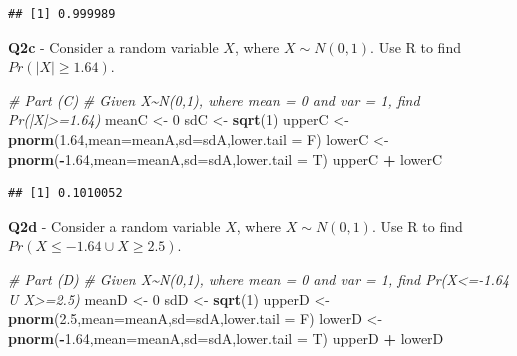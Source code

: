 \documentclass[
]{article}
\newenvironment{Shaded}{\begin{snugshade}}{\end{snugshade}}
\newcommand{\AttributeTok}[1]{\textcolor[rgb]{0.13,0.29,0.53}{#1}}
\newcommand{\CommentTok}[1]{\textcolor[rgb]{0.56,0.35,0.01}{\textit{#1}}}
\newcommand{\DecValTok}[1]{\textcolor[rgb]{0.00,0.00,0.81}{#1}}
\newcommand{\FloatTok}[1]{\textcolor[rgb]{0.00,0.00,0.81}{#1}}
\newcommand{\FunctionTok}[1]{\textcolor[rgb]{0.13,0.29,0.53}{\textbf{#1}}}
\newcommand{\NormalTok}[1]{#1}
\newcommand{\OtherTok}[1]{\textcolor[rgb]{0.56,0.35,0.01}{#1}}
\newcommand{\SpecialCharTok}[1]{\textcolor[rgb]{0.81,0.36,0.00}{\textbf{#1}}}
\begin{document}
\begin{verbatim}
## [1] 0.999989
\end{verbatim}

\hfill\break

\textbf{Q2c} - Consider a random variable \(X\), where
\(X \sim N(0,1)\). Use R to find \(Pr(|X| \geq 1.64)\).

\hfill\break

\begin{Shaded}
\begin{Highlighting}[]
\CommentTok{\# Part (C)}
\CommentTok{\# Given X\textasciitilde{}N(0,1), where mean = 0 and var = 1, find Pr(|X|\textgreater{}=1.64)}
\NormalTok{meanC }\OtherTok{\textless{}{-}} \DecValTok{0}
\NormalTok{sdC }\OtherTok{\textless{}{-}} \FunctionTok{sqrt}\NormalTok{(}\DecValTok{1}\NormalTok{)}
\NormalTok{upperC }\OtherTok{\textless{}{-}} \FunctionTok{pnorm}\NormalTok{(}\FloatTok{1.64}\NormalTok{,}\AttributeTok{mean=}\NormalTok{meanA,}\AttributeTok{sd=}\NormalTok{sdA,}\AttributeTok{lower.tail =}\NormalTok{ F)}
\NormalTok{lowerC }\OtherTok{\textless{}{-}} \FunctionTok{pnorm}\NormalTok{(}\SpecialCharTok{{-}}\FloatTok{1.64}\NormalTok{,}\AttributeTok{mean=}\NormalTok{meanA,}\AttributeTok{sd=}\NormalTok{sdA,}\AttributeTok{lower.tail =}\NormalTok{ T)}
\NormalTok{upperC }\SpecialCharTok{+}\NormalTok{ lowerC}
\end{Highlighting}
\end{Shaded}

\begin{verbatim}
## [1] 0.1010052
\end{verbatim}

\hfill\break

\textbf{Q2d} - Consider a random variable \(X\), where
\(X \sim N(0,1)\). Use R to find \(Pr(X \leq -1.64 \cup X \geq 2.5)\).

\hfill\break

\begin{Shaded}
\begin{Highlighting}[]
\CommentTok{\# Part (D)}
\CommentTok{\# Given X\textasciitilde{}N(0,1), where mean = 0 and var = 1, find Pr(X\textless{}={-}1.64 U X\textgreater{}=2.5)}
\NormalTok{meanD }\OtherTok{\textless{}{-}} \DecValTok{0}
\NormalTok{sdD }\OtherTok{\textless{}{-}} \FunctionTok{sqrt}\NormalTok{(}\DecValTok{1}\NormalTok{)}
\NormalTok{upperD }\OtherTok{\textless{}{-}} \FunctionTok{pnorm}\NormalTok{(}\FloatTok{2.5}\NormalTok{,}\AttributeTok{mean=}\NormalTok{meanA,}\AttributeTok{sd=}\NormalTok{sdA,}\AttributeTok{lower.tail =}\NormalTok{ F)}
\NormalTok{lowerD }\OtherTok{\textless{}{-}} \FunctionTok{pnorm}\NormalTok{(}\SpecialCharTok{{-}}\FloatTok{1.64}\NormalTok{,}\AttributeTok{mean=}\NormalTok{meanA,}\AttributeTok{sd=}\NormalTok{sdA,}\AttributeTok{lower.tail =}\NormalTok{ T)}
\NormalTok{upperD }\SpecialCharTok{+}\NormalTok{ lowerD}
\end{Highlighting}
\end{Shaded}
\end{document}
